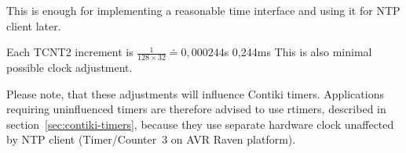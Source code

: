 This is enough for implementing a reasonable time interface and using it for NTP client later.



Each TCNT2 increment is $\frac{1}{128 \times 32} \doteq 0,000244$s
0,244ms
This is also minimal possible clock adjustment.


Please note, that these adjustments will influence Contiki timers.
Applications requiring uninfluenced timers
are therefore advised to use rtimers, described in section~\ref{sec:contiki-timers},
because they use separate hardware clock unaffected by NTP client
(Timer/Counter~3 on AVR Raven platform).
